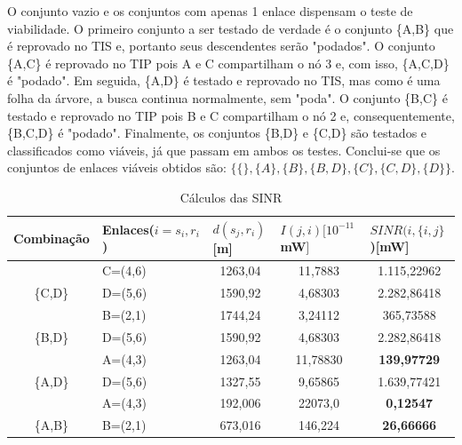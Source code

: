 O conjunto vazio e os conjuntos com apenas 1 enlace dispensam o teste de viabilidade. O primeiro conjunto a ser testado de verdade é o conjunto \{A,B\} que é reprovado no TIS e, portanto seus descendentes serão "podados". O conjunto \{A,C\} é reprovado no TIP pois A e C compartilham o nó 3 e, com isso, \{A,C,D\} é "podado". Em seguida, \{A,D\} é testado e reprovado no TIS, mas como é uma folha da árvore, a busca continua normalmente, sem "poda". O conjunto \{B,C\} é testado e reprovado no TIP pois B e C compartilham o nó 2 e, consequentemente, \{B,C,D\} é "podado". Finalmente, os conjuntos \{B,D\} e \{C,D\} são testados e classificados como viáveis, já que passam em ambos os testes.
Conclui-se que os conjuntos de enlaces viáveis obtidos são: $\{\{\},\{A\},\{B\},\{B,D\},\{C\},\{C,D\},\{D\}\}$. 

\begin{table}[H]
\centering
\caption{Cálculos das SINR}
\label{table:sinr}
\begin{tabular}{|c|l|c|c|c|}
\hline
\multicolumn{1}{|l|}{Combinação} & Enlaces($i=s_i,r_i$) & \multicolumn{1}{l|}{$d(s_j,r_i)${[}m{]}} & \multicolumn{1}{l|}{$I(j,i)[10^{-11}$mW$]$} & \multicolumn{1}{l|}{$SINR(i, \{i,j\}$){[}mW{]}} \\ \hline
                                 & C=(4,6)          & 1263,04                              & 11,7883                                  & \cellcolor[HTML]{9AFF99}1.115,22962           \\ \cline{2-5} 
\multirow{-2}{*}{\{C,D\}}        & D=(5,6)          & 1590,92                              & 4,68303                                  & \cellcolor[HTML]{9AFF99}2.282,86418           \\ \hline
                                 & B=(2,1)          & 1744,24                              & 3,24112                                  & \cellcolor[HTML]{9AFF99}365,73588             \\ \cline{2-5} 
\multirow{-2}{*}{\{B,D\}}        & D=(5,6)          & 1590,92                              & 4,68303                                  & \cellcolor[HTML]{9AFF99}2.282,86418           \\ \hline
                                 & A=(4,3)          & 1263,04                              & 11,78830                                 & \cellcolor[HTML]{FFCCC9}\textbf{139,97729}    \\ \cline{2-5} 
\multirow{-2}{*}{\{A,D\}}        & D=(5,6)          & 1327,55                              & 9,65865                                  & \cellcolor[HTML]{9AFF99}1.639,77421           \\ \hline
                                 & A=(4,3)          & 192,006                              & 22073,0                                  & \cellcolor[HTML]{FFCCC9}\textbf{0,12547}      \\ \cline{2-5} 
\multirow{-2}{*}{\{A,B\}}        & B=(2,1)          & 673,016                              & 146,224                                  & \cellcolor[HTML]{FFCCC9}\textbf{26,66666}     \\ \hline
\end{tabular}
\end{table}

